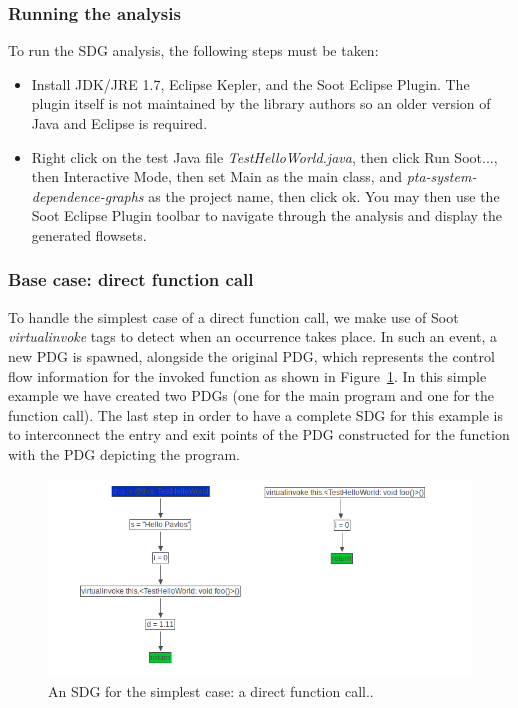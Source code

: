 \documentclass[authoryear,preprint]{sigplanconf}
\begin{document}
\subsubsection{Running the analysis}

To run the SDG analysis, the following steps must be taken:

\begin{itemize}
	\item Install JDK/JRE 1.7, Eclipse Kepler, and the Soot Eclipse Plugin. The plugin itself is not maintained by the library authors so an older version of Java and Eclipse is required.
	
	\item Right click on the test Java file \textit{TestHelloWorld.java}, then click Run Soot..., then Interactive Mode, then set Main as the main class, and \textit{pta-system-dependence-graphs} as the project name, then click ok. You may then use the Soot Eclipse Plugin toolbar to navigate through the analysis and display the generated flowsets.

\end{itemize}

\subsubsection{Base case: direct function call}

To handle the simplest case of a direct function call, we make use of Soot \textit{virtualinvoke} tags to detect when an occurrence takes place. In such an event, a new PDG is spawned, alongside the original PDG, which represents the control flow information for the invoked function as shown in Figure~\ref{f:firstImpl}. In this simple example we have created two PDGs (one for the main program and one for the function call). The last step in order to have a complete SDG for this example is to interconnect the entry and exit points of the PDG constructed for the function with the PDG depicting the program.

\begin{figure}[ht]
	\centering
	\includegraphics[width=.8\linewidth]{figures/Selection_083}
	\caption[An SDG for the simplest case: a direct function call.]{\label{f:firstImpl}An SDG for the simplest case: a direct function call..}
\end{figure}
\end{document}
